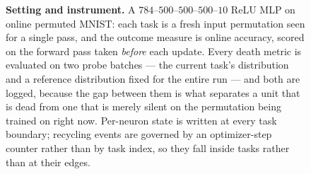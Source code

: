 \begin{figure}[t]
\caption{\textbf{Setting and instrument.} A $784$--$500$--$500$--$500$--$10$
ReLU MLP on online permuted MNIST: each task is a fresh input permutation seen
for a single pass, and the outcome measure is online accuracy, scored on the
forward pass taken \emph{before} each update. Every death metric is evaluated on
two probe batches --- the current task's distribution and a reference
distribution fixed for the entire run --- and both are logged, because the gap
between them is what separates a unit that is dead from one that is merely
silent on the permutation being trained on right now. Per-neuron state is
written at every task boundary; recycling events are governed by an
optimizer-step counter rather than by task index, so they fall inside tasks
rather than at their edges.}
\label{fig:arch}
\end{figure}
